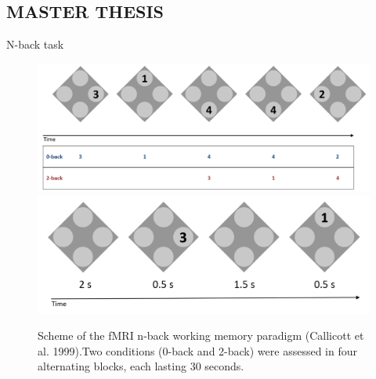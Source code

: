 \documentclass{bredelebeamer}
\begin{document}
\subsection{MASTER THESIS}
\begin{frame}{N-back task}
	\begin{figure}
   			 \includegraphics[scale=0.43]{images/n-back_logik.PNG} \\
   			 \includegraphics[scale=0.3]{images/n-back_timeline.PNG}
   					\caption{\tiny{ Scheme of the fMRI n-back working memory paradigm (Callicott et al. 1999\cite{Callicott.1999}).Two conditions (0-back and 2-back) were assessed
in four alternating blocks, each lasting 30 seconds.}}
\end{figure}
\end{frame}
\end{document}
